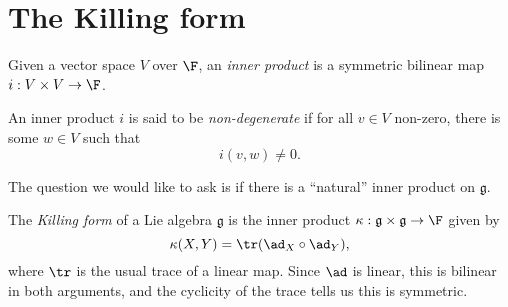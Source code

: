 \documentclass[a4paper]{article}
\begin{document}
\section{The Killing form}
\begin{defi}
  Given a vector space $V$ over $\F$, an \emph{inner product} is a symmetric bilinear map $i: V \times V \to \F$.
\end{defi}

\begin{defi}
  An inner product $i$ is said to be \emph{non-degenerate} if for all $v \in V$ non-zero, there is some $w \in V$ such that
  \[
    i(v, w) \not= 0.
  \]
\end{defi}

The question we would like to ask is if there is a ``natural'' inner product on $\mathfrak{g}$.

\begin{defi}
  The \emph{Killing form} of a Lie algebra $\mathfrak{g}$ is the inner product $\kappa: \mathfrak{g} \times \mathfrak{g} \to \F$ given by
  \[
    \kappa(X, Y) = \tr(\ad_X \circ \ad_Y),
  \]
  where $\tr$ is the usual trace of a linear map. Since $\ad$ is linear, this is bilinear in both arguments, and the cyclicity of the trace tells us this is symmetric.
\end{defi}
\end{document}
